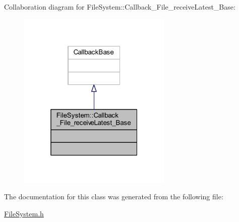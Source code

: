 Collaboration diagram for File\+System\+:\+:Callback\+\_\+\+File\+\_\+receive\+Latest\+\_\+\+Base\+:
\nopagebreak
\begin{figure}[H]
\begin{center}
\leavevmode
\includegraphics[width=208pt]{class_file_system_1_1_callback___file__receive_latest___base__coll__graph}
\end{center}
\end{figure}


The documentation for this class was generated from the following file\+:\begin{DoxyCompactItemize}
\item 
\hyperlink{_file_system_8h}{File\+System.\+h}\end{DoxyCompactItemize}

